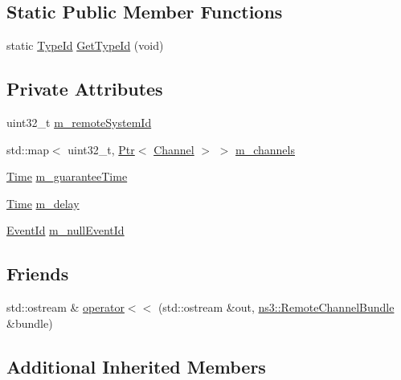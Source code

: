 \subsection*{Static Public Member Functions}
\begin{DoxyCompactItemize}
\item 
static \hyperlink{classns3_1_1TypeId}{Type\+Id} \hyperlink{classns3_1_1RemoteChannelBundle_ac5ba4b24de4c9e5d2dba7bfb163ef488}{Get\+Type\+Id} (void)
\end{DoxyCompactItemize}
\subsection*{Private Attributes}
\begin{DoxyCompactItemize}
\item 
uint32\+\_\+t \hyperlink{classns3_1_1RemoteChannelBundle_ae00de088286f8301c85a3becc766d5a7}{m\+\_\+remote\+System\+Id}
\item 
std\+::map$<$ uint32\+\_\+t, \hyperlink{classns3_1_1Ptr}{Ptr}$<$ \hyperlink{classns3_1_1Channel}{Channel} $>$ $>$ \hyperlink{classns3_1_1RemoteChannelBundle_ad2e580a9b0b3a7ca3e7dd241e9307faf}{m\+\_\+channels}
\item 
\hyperlink{classns3_1_1Time}{Time} \hyperlink{classns3_1_1RemoteChannelBundle_acd2adaa59c29d3a4bf94dba13a563ebf}{m\+\_\+guarantee\+Time}
\item 
\hyperlink{classns3_1_1Time}{Time} \hyperlink{classns3_1_1RemoteChannelBundle_a18a05fe3b0c6e58618b261c148d47031}{m\+\_\+delay}
\item 
\hyperlink{classns3_1_1EventId}{Event\+Id} \hyperlink{classns3_1_1RemoteChannelBundle_af7a9da03ea61b30c0d8e30ed874c4b88}{m\+\_\+null\+Event\+Id}
\end{DoxyCompactItemize}
\subsection*{Friends}
\begin{DoxyCompactItemize}
\item 
std\+::ostream \& \hyperlink{classns3_1_1RemoteChannelBundle_ab308384eaca02cc8ef5e64dd88558ef6}{operator$<$$<$} (std\+::ostream \&out, \hyperlink{classns3_1_1RemoteChannelBundle}{ns3\+::\+Remote\+Channel\+Bundle} \&bundle)
\end{DoxyCompactItemize}
\subsection*{Additional Inherited Members}


